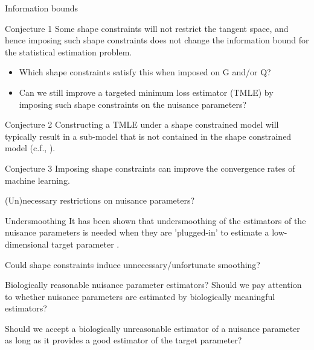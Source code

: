 \documentclass[smaller]{beamer}\usepackage{listings}
\begin{document}
\begin{frame}[label={sec:orgb9ccb59}]{Information bounds}
\begin{alertblock}{Conjecture 1}
Some shape constraints will not restrict the tangent space, and hence
imposing such shape constraints does not change the information bound
for the statistical estimation problem.

\begin{itemize}
\item Which shape constraints satisfy this when imposed on G and/or Q?
\item Can we still improve a targeted minimum loss estimator (TMLE) by
imposing such shape constraints on the nuisance parameters?
\end{itemize}
\end{alertblock}

\begin{alertblock}{Conjecture 2}
Constructing a TMLE under a shape constrained model will typically result in a
sub-model that is not contained in the shape constrained model (c.f.,
\cite{van1989asymptotic}).
\end{alertblock}

\begin{alertblock}{Conjecture 3}
Imposing shape constraints can improve the convergence rates of
machine learning.
\end{alertblock}
\end{frame}

\begin{frame}[label={sec:orgb1b9ec5}]{(Un)necessary restrictions on nuisance parameters?}
\begin{block}{Undersmoothing}
It has been shown that undersmoothing of the estimators of the
nuisance parameters is needed when they are 'plugged-in' to estimate a
low-dimensional target parameter
\citep[e.g.,][]{goldstein1996efficient,hjort2001note,van2022efficient}.
\vspace{1em}

\alert{Could shape constraints induce unnecessary/unfortunate smoothing?}
\end{block}


\begin{block}{Biologically reasonable nuisance parameter estimators?}
Should we pay attention to whether nuisance parameters are estimated
by biologically meaningful estimators? \vspace{1em}

Should we accept a biologically unreasonable estimator of a nuisance parameter
as long as it provides a good estimator of the target parameter?
\end{block}
\end{frame}
\end{document}
